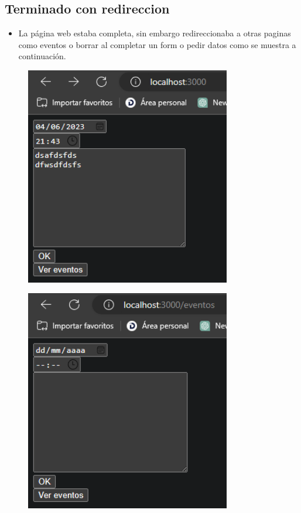 \documentclass{article}
\begin{document}
	\subsection{Terminado con redireccion}
	\begin{itemize}	
		\item La página web estaba completa, sin embargo redireccionaba a otras paginas como eventos
		o borrar al completar un form o pedir datos como se muestra a continuación.
	\end{itemize}
	
	
	\begin{figure}[H]
		\centering
		\includegraphics[width=0.8\textwidth,keepaspectratio]{img/localhost02.png}
	\end{figure}
	\begin{figure}[H]
		\centering
		\includegraphics[width=0.8\textwidth,keepaspectratio]{img/l-eventos.png}
	\end{figure}
\end{document}
